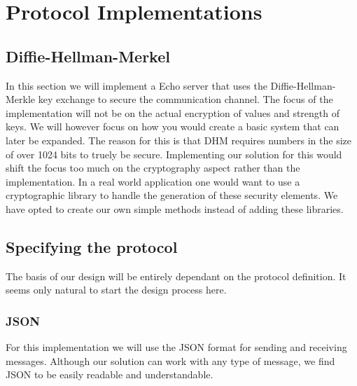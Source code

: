 \section{Protocol Implementations}
\subsection{Diffie-Hellman-Merkel}
In this section we will implement a Echo server that uses the Diffie-Hellman-Merkle key exchange to secure the communication channel. The focus of the implementation will not be on the actual encryption of values and strength of keys. We will however focus on how you would create a basic system that can later be expanded. The reason for this is that DHM requires numbers in the size of over 1024 bits to truely be secure. Implementing our solution for this would shift the focus too much on the cryptography aspect rather than the implementation. In  a real world application one would want to use a cryptographic library to handle the generation of these security elements. We have opted to create our own simple methods instead of adding these libraries.

\subsection{Specifying the protocol}
The basis of our design will be entirely dependant on the protocol definition. It seems only natural to start the design process here.

\subsubsection{JSON}
For this implementation we will use the JSON format for sending and receiving messages. Although our solution can work with any type of message, we find JSON to be easily readable and understandable.

